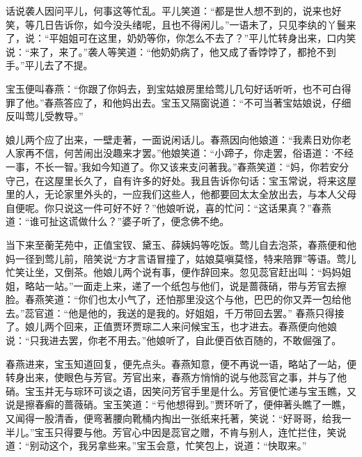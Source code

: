 
\begin{parag}
    话说袭人因问平儿，何事这等忙乱。平儿笑道：“都是世人想不到的，说来也好笑，等几日告诉你，如今没头绪呢，且也不得闲儿。”一语未了，只见李纨的丫鬟来了，说：“平姐姐可在这里，奶奶等你，你怎么不去了？”平儿忙转身出来，口内笑说：“来了，来了。”袭人等笑道：“他奶奶病了，他又成了香饽饽了，都抢不到手。”平儿去了不提。
\end{parag}


\begin{parag}
    宝玉便叫春燕：“你跟了你妈去，到宝姑娘房里给莺儿几句好话听听，也不可白得罪了他。”春燕答应了，和他妈出去。宝玉又隔窗说道：“不可当著宝姑娘说，仔细反叫莺儿受教导。”
\end{parag}


\begin{parag}
    娘儿两个应了出来，一壁走著，一面说闲话儿。春燕因向他娘道：“我素日劝你老人家再不信，何苦闹出没趣来才罢。”他娘笑道：“小蹄子，你走罢，俗语道：‘不经一事，不长一智。’我如今知道了。你又该来支问著我。”春燕笑道：“妈，你若安分守己，在这屋里长久了，自有许多的好处。我且告诉你句话：宝玉常说，将来这屋里的人，无论家里外头的，一应我们这些人，他都要回太太全放出去，与本人父母自便呢。你只说这一件可好不好？”他娘听说，喜的忙问：“这话果真？”春燕道：“谁可扯这谎做什么？”婆子听了，便念佛不绝。
\end{parag}


\begin{parag}
    当下来至蘅芜苑中，正值宝钗、黛玉、薛姨妈等吃饭。莺儿自去泡茶，春燕便和他妈一径到莺儿前，陪笑说“方才言语冒撞了，姑娘莫嗔莫怪，特来陪罪”等语。莺儿忙笑让坐，又倒茶。他娘儿两个说有事，便作辞回来。忽见蕊官赶出叫：“妈妈姐姐，略站一站。”一面走上来，递了一个纸包与他们，说是蔷薇硝，带与芳官去擦脸。春燕笑道：“你们也太小气了，还怕那里没这个与他，巴巴的你又弄一包给他去。”蕊官道：“他是他的，我送的是我的。好姐姐，千万带回去罢。” 春燕只得接了。娘儿两个回来，正值贾环贾琮二人来问候宝玉，也才进去。春燕便向他娘说：“只我进去罢，你老不用去。”他娘听了，自此便百依百随的，不敢倔强了。
\end{parag}


\begin{parag}
    春燕进来，宝玉知道回复，便先点头。春燕知意，便不再说一语，略站了一站，便转身出来，使眼色与芳官。芳官出来，春燕方悄悄的说与他蕊官之事，并与了他硝。宝玉并无与琮环可谈之语，因笑问芳官手里是什么。芳官便忙递与宝玉瞧，又说是擦春癣的蔷薇硝。宝玉笑道：“亏他想得到。”贾环听了，便伸著头瞧了一瞧，又闻得一股清香，便弯著腰向靴桶内掏出一张纸来托著，笑说：“好哥哥，给我一半儿。”宝玉只得要与他。芳官心中因是蕊官之赠，不肯与别人，连忙拦住，笑说道：“别动这个，我另拿些来。”宝玉会意，忙笑包上，说道：“快取来。”
\end{parag}


